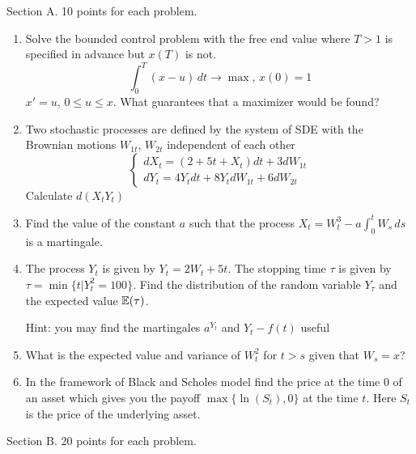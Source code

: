 \documentclass[pdftex,12pt,a4paper]{article}
\begin{document}
Section A.  10 points for each problem.

\begin{enumerate}
\item Solve the bounded control problem with the free end value where $T>1$ is specified in advance but $x(T)$ is not.
\begin{equation}
\int_0^T(x-u)\,dt\to \max,\, x(0)=1 \nonumber
\end{equation}
$x'=u$, $0\leq u\leq x$. What guarantees that a maximizer would be found?

\item Two stochastic processes are defined by the system of SDE with the Brownian motions $W_{1t}$, $W_{2t}$ independent of each other
\begin{equation}
\begin{cases}
dX_t=(2+5t+X_t)dt+3dW_{1t} \\
dY_t=4Y_t dt+8Y_t dW_{1t}+6dW_{2t} \nonumber
\end{cases}
\end{equation}
Calculate $d(X_t Y_t)$

\item Find the value of the constant $a$ such that the process $X_t=W_t^3-a\int_0^t W_s\,ds$ is a martingale.

\item The process $Y_t$ is given by $Y_t=2W_t+5t$. The stopping time $\tau$ is given by $\tau=\min\{t|Y_t^2=100\}$. Find the distribution of the random variable $Y_\tau$ and the expected value $\mathbb{E}(\tau)$.


Hint: you may find the martingales $a^{Y_t}$ and $Y_t-f(t)$ useful

\item What is the expected value and variance of $W_t^2$ for $t>s$ given that $W_s=x$?

\item In the framework of Black and Scholes model find the price at the time $0$ of an asset which gives you the payoff $\max\{\ln(S_t),0\}$ at the time $t$. Here $S_t$ is the price of the underlying asset.
\end{enumerate}

Section B. 20 points for each problem. 
\end{document}
